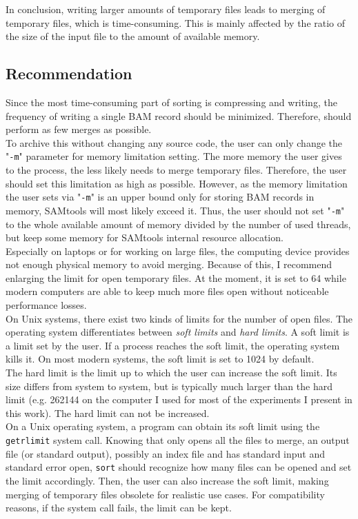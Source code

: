 In conclusion, writing larger amounts of temporary files leads to merging of temporary files, which is time-consuming. This is mainly affected by the ratio of the size of the input file to the amount of available memory.

\subsection{Recommendation}

Since the most time-consuming part of sorting is compressing and writing, the frequency of writing a single BAM record should be minimized. Therefore, \sort should perform as few merges as possible. \\
To archive this without changing any source code, the user can only change the "\texttt{-m}" parameter for memory limitation setting. The more memory the user gives to the process, the less likely \sort needs to merge temporary files. Therefore, the user should set this limitation as high as possible. However, as the memory limitation the user sets via "\texttt{-m}" is an upper bound only for storing BAM records in memory, SAMtools will most likely exceed it. Thus, the user should not set "\texttt{-m}" to the whole available amount of memory divided by the number of used threads, but keep some memory for SAMtools internal resource allocation. \\
Especially on laptops or for working on large files, the computing device provides not enough physical memory to avoid merging. Because of this, I recommend enlarging the limit for open temporary files. At the moment, it is set to 64 while modern computers are able to keep much more files open without noticeable performance losses. \\
On Unix systems, there exist two kinds of limits for the number of open files. The operating system differentiates between \textit{soft limits} and \textit{hard limits}.
A soft limit is a limit set by the user. If a process reaches the soft limit, the operating system kills it. On most modern systems, the soft limit is set to 1024 by default. \\
The hard limit is the limit up to which the user can increase the soft limit. Its size differs from system to system, but is typically much larger than the hard limit (e.g. 262144 on the computer I used for most of the experiments I present in this work). The hard limit can not be increased. \\
On a Unix operating system, a program can obtain its soft limit using the \texttt{getrlimit} \cite{noauthor_getrlimit2_nodate} system call. Knowing that \sort only opens all the files to merge, an output file (or standard output), possibly an index file and has standard input and standard error open, \texttt{sort} should recognize how many files can be opened and set the limit accordingly. Then, the user can also increase the soft limit, making merging of temporary files obsolete for realistic use cases. For compatibility reasons, if the system call fails, the limit can be kept.
